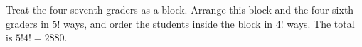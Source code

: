 Treat the four seventh-graders as a block. Arrange this block and the four sixth-graders in $5!$ ways, and order the students inside the block in $4!$ ways. The total is $5!4!=\boxed{2880}$.
